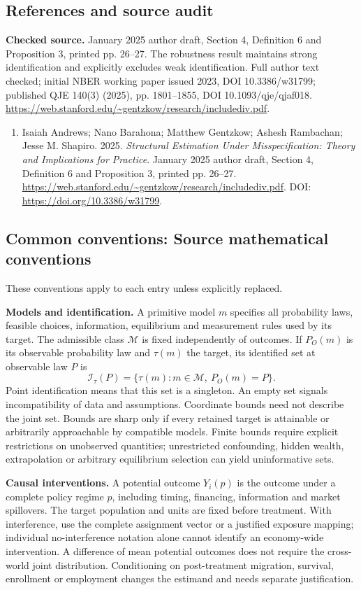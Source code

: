 \documentclass[11pt,a4paper]{article}
\begin{document}
\subsection*{References and source audit}
\textbf{Checked source.} January 2025 author draft, Section 4, Definition 6 and Proposition 3, printed pp. 26--27. The robustness result maintains strong identification and explicitly excludes weak identification. Full author text checked; initial NBER working paper issued 2023, DOI 10.3386/w31799; published QJE 140(3) (2025), pp. 1801--1855, DOI 10.1093/qje/qjaf018. \url{https://web.stanford.edu/~gentzkow/research/includediv.pdf}.
\begin{enumerate}\raggedright
\item\hypertarget{definitions:source:30007708:1}{} Isaiah Andrews; Nano Barahona; Matthew Gentzkow; Ashesh Rambachan; Jesse M. Shapiro. 2025. \emph{Structural Estimation Under Misspecification: Theory and Implications for Practice}. January 2025 author draft, Section 4, Definition 6 and Proposition 3, printed pp. 26--27.
\url{https://web.stanford.edu/~gentzkow/research/includediv.pdf}.
DOI: \url{https://doi.org/10.3386/w31799}.
\end{enumerate}

\subsection*{Common conventions: Source mathematical conventions}

These conventions apply to each entry unless explicitly replaced.

\textbf{Models and identification.} A primitive model \(m\) specifies all probability laws, feasible choices, information, equilibrium and measurement rules used by its target. The admissible class \(\mathcal M\) is fixed independently of outcomes. If \(P_O(m)\) is its observable probability law and \(\tau(m)\) the target, its identified set at observable law \(P\) is
\[
 \mathcal I_\tau(P)=\{\tau(m):m\in\mathcal M,\ P_O(m)=P\}.
\]
Point identification means that this set is a singleton. An empty set signals incompatibility of data and assumptions. Coordinate bounds need not describe the joint set. Bounds are sharp only if every retained target is attainable or arbitrarily approachable by compatible models. Finite bounds require explicit restrictions on unobserved quantities; unrestricted confounding, hidden wealth, extrapolation or arbitrary equilibrium selection can yield uninformative sets.

\textbf{Causal interventions.} A potential outcome \(Y_i(p)\) is the outcome under a complete policy regime \(p\), including timing, financing, information and market spillovers. The target population and units are fixed before treatment. With interference, use the complete assignment vector or a justified exposure mapping; individual no-interference notation alone cannot identify an economy-wide intervention. A difference of mean potential outcomes does not require the cross-world joint distribution. Conditioning on post-treatment migration, survival, enrollment or employment changes the estimand and needs separate justification.
\end{document}
